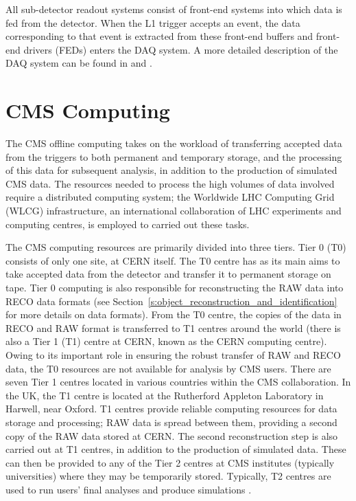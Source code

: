 All sub-detector readout systems consist of front-end systems into which data is fed from the detector.
When the L1 trigger accepts an event, the data corresponding to that event is extracted from these front-end
buffers and front-end drivers (FEDs) enters the DAQ system. A more detailed description of the DAQ system can
be found in \cite{CMS_experiment} and \cite{CMS_TDR1}.

\section{CMS Computing}
\label{s:CMS_computing}

The CMS offline computing takes on the workload of transferring accepted data from the triggers to both
permanent and temporary storage, and the processing of this data for subsequent analysis, in addition to the
production of simulated CMS data. The resources needed to process the high volumes of data involved require a
distributed computing system; the Worldwide LHC Computing Grid (WLCG) infrastructure, an international
collaboration of LHC experiments and computing centres, is employed to carried out these tasks.

The CMS computing resources are primarily divided into three tiers. Tier 0 (T0) consists of only one site, at
CERN itself. The T0 centre has as its main aims to take accepted data from the detector and transfer it to
permanent storage on tape. Tier 0 computing is also responsible for reconstructing the RAW data into RECO data
formats (see Section~\ref{s:object_reconstruction_and_identification} for more details on data formats). From
the T0 centre, the copies of the data in RECO and RAW format is transferred to T1 centres around the world
(there is also a Tier 1 (T1) centre at CERN, known as the CERN computing centre). Owing to its important role
in ensuring the robust transfer of RAW and RECO data, the T0 resources are not available for analysis by CMS
users. There are seven Tier 1 centres located in various countries within the CMS collaboration. In the UK,
the T1 centre is located at the Rutherford Appleton Laboratory in Harwell, near Oxford. T1 centres provide
reliable computing resources for data storage and processing; RAW data is spread between them, providing a
second copy of the RAW data stored at CERN. The second reconstruction step is also carried out at T1 centres,
in addition to the production of simulated data. These can then be provided to any of the Tier 2 centres at
CMS institutes (typically universities) where they may be temporarily stored. Typically, T2 centres are used
to run users' final analyses and produce simulations \cite{CMS_experiment,CMS_TDR1}.

